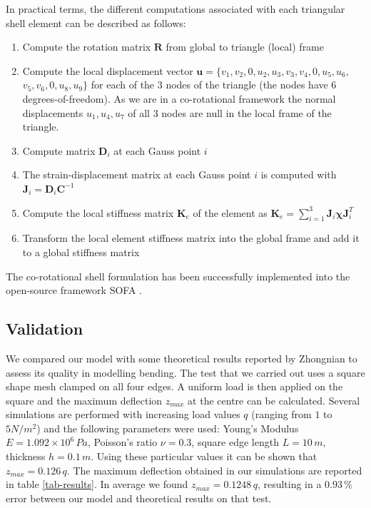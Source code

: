 \documentclass{llncs}
\begin{document}
In practical terms, the different computations associated with each triangular shell element can be described as follows:
%
\begin{enumerate}
\item Compute the rotation matrix $\textbf{R}$ from global to triangle (local) frame
\item Compute the local displacement vector $\textbf{u} = \{v_1, v_2, 0, u_2, u_3, v_3, v_4, 0, u_5, u_6,$ $v_5, v_6, 0, u_8, u_9 \} $ for each of the 3 nodes of the triangle (the nodes have 6 degrees-of-freedom). As we are in a co-rotational framework the normal displacements $u_1, u_4, u_7$ of all 3 nodes are null in the local frame of the triangle. 
\item Compute matrix $\textbf{D}_i$  at each Gauss point $i$
\item The strain-displacement matrix at each Gauss point $i$ is computed with $\textbf{J}_i = \textbf{D}_i \textbf{C}^{-1}$
\item Compute the local stiffness matrix $\textbf{K}_e$ of the element as $\textbf{K}_e = \displaystyle{\sum^3_{i=1}} \textbf{J}_i \boldsymbol\chi \textbf{J}_i^T$
\item Transform the local element stiffness matrix into the global frame and add it to a global stiffness matrix
\end{enumerate}

The co-rotational shell formulation has been successfully implemented into the open-source framework SOFA \cite{SOFA}. 

\subsection{Validation}

We compared our model with some theoretical results reported by Zhongnian \cite{Zhongnian86} to assess its quality in modelling bending. The test that we carried out uses a square shape mesh clamped on all four edges. A uniform load is then applied on the square and the maximum deflection $z_{max}$ at the centre can be calculated. Several simulations are performed with increasing load values $q$ (ranging from $1$ to $5 N/m^2$) and the following parameters were used: Young's Modulus $E = 1.092 \times 10^6 \,Pa$, Poisson's ratio $\nu = 0.3$, square edge length $L = 10\,m$, thickness $h = 0.1\,m$. Using these particular values it can be shown that $z_{max} = 0.126\,q$. The maximum deflection obtained in our simulations are reported in table \ref{tab-results}. In average we found $z_{max} = 0.1248\,q $, resulting in a $0.93\,\%$ error between our model and theoretical results on that test. 
\end{document}
